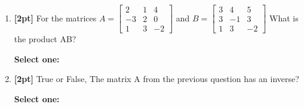 \documentclass[12pt]{article}
\renewcommand{\circle}{\tikz\draw[black] (0,0) circle (1ex);}
\begin{document}
\begin{enumerate}
    \item \textbf{[2pt]} For the matrices $A=\begin{bmatrix} 2 & 1 & 4 \\ -3 & 2 & 0 \\ 1 & 3 & -2 \end{bmatrix} $ and $B=\begin{bmatrix} 3 & 4 & 5 \\ 3 & -1 & 3 \\ 1 & 3 & -2 \end{bmatrix}$
What is the product AB?

    \textbf{Select one:}


    \item \textbf{[2pt]} True or False, The matrix A from the previous question has an inverse?

    \textbf{Select one:}


    \clearpage
\end{enumerate}
\end{document}
